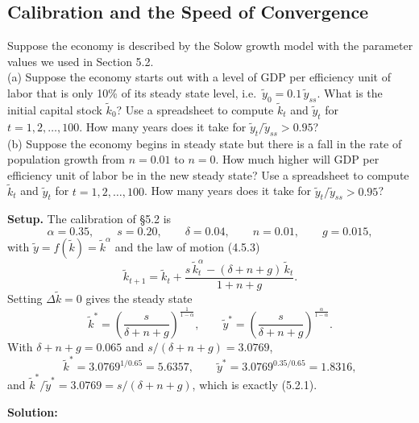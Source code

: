 \documentclass[12pt, letterpaper]{article}
\newcommand{\stst}{^{\ast}}
\begin{document}
\subsection{Calibration and the Speed of Convergence}

\begin{tcolorbox}[oddbox,title={Problem 5.1 \quad Quantifying the Solow Model}]
\begin{tcolorbox}[questionbox]
Suppose the economy is described by the Solow growth model with the parameter values we used
in Section 5.2.\\[3pt]
(a) Suppose the economy starts out with a level of GDP per efficiency unit of labor that is
only 10\% of its steady state level, i.e.\ $\tilde y_0=0.1\,\tilde y_{ss}$. What is the
initial capital stock $\tilde k_0$? Use a spreadsheet to compute $\tilde k_t$ and
$\tilde y_t$ for $t=1,2,\dots,100$. How many years does it take for
$\tilde y_t/\tilde y_{ss}>0.95$?\\[3pt]
(b) Suppose the economy begins in steady state but there is a fall in the rate of population
growth from $n=0.01$ to $n=0$. How much higher will GDP per efficiency unit of labor be in
the new steady state? Use a spreadsheet to compute $\tilde k_t$ and $\tilde y_t$ for
$t=1,2,\dots,100$. How many years does it take for $\tilde y_t/\tilde y_{ss}>0.95$?
\end{tcolorbox}

\textbf{Setup.} The calibration of \S5.2 is
\[
\alpha=0.35,\qquad s=0.20,\qquad \delta=0.04,\qquad n=0.01,\qquad g=0.015,
\]
with $\tilde y=f(\tilde k)=\tilde k^{\alpha}$ and the law of motion (4.5.3)
\[
\tilde k_{t+1}=\tilde k_t+\frac{s\,\tilde k_t^{\alpha}-(\delta+n+g)\,\tilde k_t}{1+n+g}.
\tag{$\ast$}
\]
Setting $\Delta\tilde k=0$ gives the steady state
\[
\tilde k\stst=\left(\frac{s}{\delta+n+g}\right)^{\frac{1}{1-\alpha}},
\qquad
\tilde y\stst=\left(\frac{s}{\delta+n+g}\right)^{\frac{\alpha}{1-\alpha}} .
\]
With $\delta+n+g=0.065$ and $s/(\delta+n+g)=3.0769$,
\[
\tilde k\stst=3.0769^{1/0.65}=\boxed{5.6357},
\qquad
\tilde y\stst=3.0769^{0.35/0.65}=\boxed{1.8316},
\]
and $\tilde k\stst/\tilde y\stst=3.0769=s/(\delta+n+g)$, which is exactly (5.2.1).
\checkmark

\textbf{Solution:}
\begin{enumerate}


\end{enumerate}
\end{tcolorbox}
\end{document}

